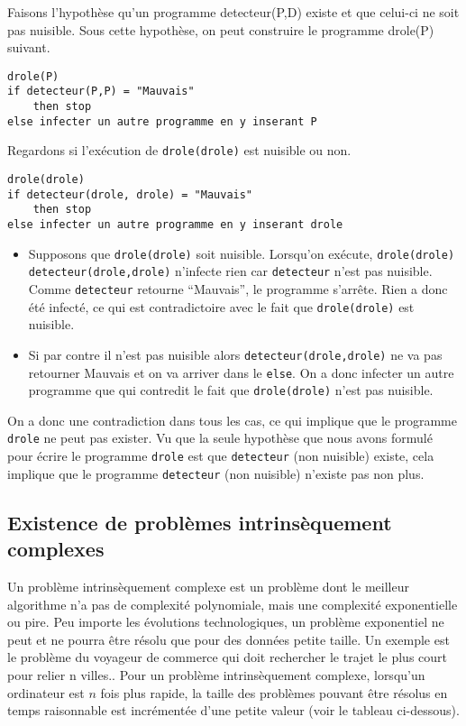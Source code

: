 Faisons l'hypothèse qu'un programme detecteur(P,D) existe et que celui-ci ne soit pas nuisible.  Sous cette hypothèse, on peut construire le programme  drole(P) suivant.

\label{lst:detecteur_de_virus}
\begin{lstlisting}
drole(P)
if detecteur(P,P) = "Mauvais"
	then stop
else infecter un autre programme en y inserant P
\end{lstlisting}

Regardons si l'exécution de \lstinline|drole(drole)| est nuisible ou non.  
\begin{lstlisting}
drole(drole)
if detecteur(drole, drole) = "Mauvais"
	then stop
else infecter un autre programme en y inserant drole
\end{lstlisting}

\begin{itemize}
	\item Supposons que \lstinline|drole(drole)| soit nuisible.
      Lorsqu'on exécute, \lstinline|drole(drole)|
      \lstinline|detecteur(drole,drole)| n'infecte rien car \lstinline|detecteur| n'est pas nuisible.
      Comme \lstinline|detecteur| retourne ``Mauvais'',
      le programme s'arrête.
      Rien a donc été infecté, ce qui est contradictoire avec le fait que \lstinline|drole(drole)| est nuisible.
	\item Si par contre il n'est pas nuisible alors \lstinline|detecteur(drole,drole)|
      ne va pas retourner Mauvais et on va arriver dans le \lstinline|else|.
      On a donc infecter un autre programme que qui contredit le fait que \lstinline|drole(drole)| n'est pas nuisible.
\end{itemize}

On a donc une contradiction dans tous les cas, ce qui implique que le programme \lstinline|drole| ne peut pas
exister. Vu que la seule hypothèse que nous avons formulé pour écrire le programme \lstinline|drole| est que \lstinline|detecteur| (non nuisible) existe, 
cela implique que le programme \lstinline|detecteur| (non nuisible) n'existe pas non plus.

\subsection{ Existence de problèmes intrinsèquement complexes}
\label{subsec:existence_de_problemes_intrinsequement_complexes}

Un problème intrinsèquement complexe est un problème dont le meilleur algorithme n'a pas de complexité polynomiale, mais une complexité exponentielle ou pire.  Peu importe les évolutions technologiques, un problème exponentiel ne peut et ne pourra être résolu que pour des données petite taille.  Un exemple est le problème du voyageur de commerce qui doit rechercher le trajet le plus court pour relier n villes..  Pour un problème intrinsèquement complexe, lorsqu'un ordinateur est $n$ fois plus rapide,  la taille des problèmes pouvant être résolus en temps raisonnable est incrémentée d'une petite valeur (voir le tableau ci-dessous).

